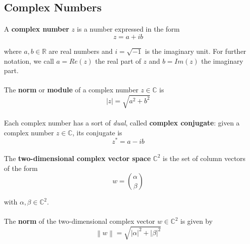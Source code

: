 \documentclass[a4paper,10pt]{article}
\newcommand\norm[1]{\left\lVert#1\right\rVert}
\begin{document}
\subsection{Complex Numbers}

\paragraph{} A \textbf{complex number} $z$ is a number expressed in the form
\begin{equation}
z = a + ib
\label{eq:complexNumber}
\end{equation}

where $a, b \in {\mathbb{R}}$ are real numbers and $i = \sqrt{-1}$ is the imaginary unit. For further notation, we call $a = Re(z)$ the real part of $z$ and $b = Im(z)$ the imaginary part.

\paragraph{} The \textbf{norm} or \textbf{module} of a complex number $z \in \mathbb{C}$ is 
\begin{equation}
|z| = \sqrt{a^2 + b^2}
\label{eq:complexNumberNorm}
\end{equation}

\paragraph{} Each complex number has a sort of \textit{dual}, called \textbf{complex conjugate}: given a complex number $z \in \mathbb{C}$, its conjugate is
\begin{equation}
z^* = a - ib
\label{eq:complexNumberConjugate}
\end{equation}

\paragraph{} The \textbf{two-dimensional complex vector space} ${\mathbb{C}}^2$ is the set of column vectors of the form
\begin{equation}
w = \binom{\alpha}{\beta}
\label{eq:twoDimensionalComplexVectorSpace}
\end{equation}

with ${\alpha}, {\beta} \in {\mathbb{C}}^2$.

\paragraph{} The \textbf{norm} of the two-dimensional complex vector $w \in {\mathbb{C}}^2$ is given by
\begin{equation}
\norm{w} = \sqrt{|\alpha|^2 + |\beta|^2}
\label{eq:complexVectorNorm}
\end{equation}
\end{document}
